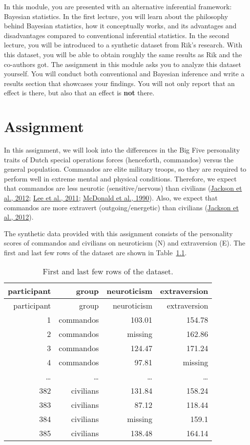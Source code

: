\documentclass[
  notoc %
]{tufte-book}
\begin{document}
In this module, you are presented with an alternative inferential
framework: Bayesian statistics. In the first lecture, you will learn
about the philosophy behind Bayesian statistics, how it conceptually
works, and its advantages and disadvantages compared to conventional
inferential statistics. In the second lecture, you will be introduced to
a synthetic dataset from Rik's research. With this dataset, you will be
able to obtain roughly the same results as Rik and the co-authors got.
The assignment in this module asks you to analyze this dataset yourself.
You will conduct both conventional and Bayesian inference and write a
results section that showcases your findings. You will not only report
that an effect is there, but also that an effect is \textbf{not} there.

\hypertarget{sec:assignment}{%
\chapter{Assignment}\label{sec:assignment}}

In this assignment, we will look into the differences in the Big Five
personality traits of Dutch special operations forces (henceforth,
commandos) versus the general population. Commandos are elite military
troops, so they are required to perform well in extreme mental and
physical conditions. Therefore, we expect that commandos are less
neurotic (sensitive/nervous) than civilians
(\protect\hyperlink{ref-jackson2012military}{Jackson et al., 2012};
\protect\hyperlink{ref-lee2011prospective}{Lee et al., 2011};
\protect\hyperlink{ref-mcdonald1990training}{McDonald et al., 1990}).
Also, we expect that commandos are more extravert (outgoing/energetic)
than civilians (\protect\hyperlink{ref-jackson2012military}{Jackson et
al., 2012}).

The synthetic data provided with this assignment consists of the
personality scores of commandos and civilians on neuroticism (N) and
extraversion (E). The first and last few rows of the dataset are shown
in Table~\ref{tbl:dataset}.

\hypertarget{tbl:dataset}{}
\begin{longtable}[]{@{}rrrr@{}}
\caption{\label{tbl:dataset}First and last few rows of the
dataset.}\tabularnewline
\toprule
participant & group & neuroticism & extraversion \\
\midrule
\endfirsthead
\toprule
participant & group & neuroticism & extraversion \\
\midrule
\endhead
1 & commandos & 103.01 & 154.78 \\
2 & commandos & missing & 162.86 \\
3 & commandos & 124.47 & 171.24 \\
4 & commandos & 97.81 & missing \\
\ldots{} & \ldots{} & \ldots{} & \ldots{} \\
382 & civilians & 131.84 & 158.24 \\
383 & civilians & 87.12 & 118.44 \\
384 & civilians & missing & 159.1 \\
385 & civilians & 138.48 & 164.14 \\
\bottomrule
\end{longtable}
\end{document}
